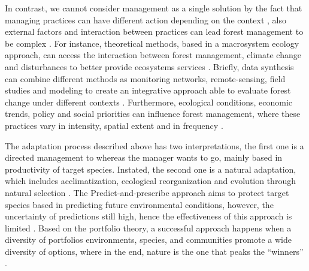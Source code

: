 In contrast, we cannot consider management as a single solution by the fact that managing practices can have different action depending on the context \parencite{Millar2007}, also external factors and interaction between practices can lead forest management to be complex \parencite{Becknell2015}.
For instance, theoretical methods, based in a macrosystem ecology approach, can access the interaction between forest management, climate change and disturbances to better provide ecosystems services \parencite{Heffernan2014,Becknell2015}.
Briefly, data synthesis can combine different methods as monitoring networks, remote-sensing, field studies and modeling to create an integrative approach able to evaluate forest change under different contexts \parencite{Becknell2015}.
Furthermore, ecological conditions, economic trends, policy and social priorities can influence forest management, where these practices vary in intensity, spatial extent and in frequency \parencite{Becknell2015}.

The adaptation process described above has two interpretations, the first one is a directed management to whereas the manager wants to go, mainly based in productivity of target species.  Instated, the second one is a natural adaptation, which includes acclimatization, ecological reorganization and evolution through natural selection \parencite{Webster2017}.
The Predict-and-prescribe approach aims to protect target species based in predicting future environmental conditions, however, the uncertainty of predictions still high, hence the effectiveness of this approach is limited \parencite{Schindler2015}.
Based on the portfolio theory, a successful approach happens when a diversity of portfolios environments, species, and communities promote a wide diversity of options, where in the end, nature is the one that peaks the ``winners'' \parencite{Webster2017}.

%



